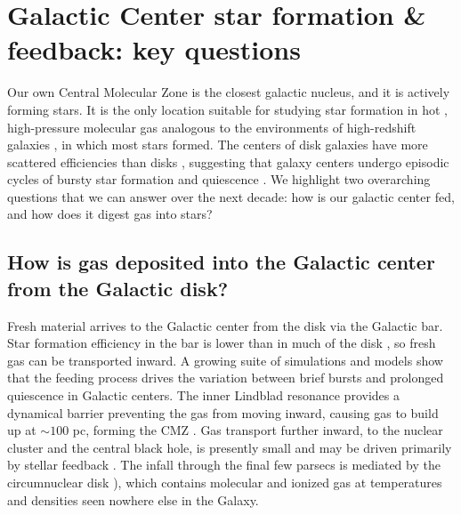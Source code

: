 \documentclass[modern]{aastex62}
\begin{document}
\clearpage

\section{Galactic Center star formation \& feedback: key questions}



Our own Central Molecular Zone is the closest galactic nucleus, and it is
actively forming stars. It is the only location suitable for studying star
formation in hot \citep{Ao2013a, Ginsburg2016a, Krieger2017a}, high-pressure
molecular gas analogous to the environments of high-redshift galaxies
\citep{Kruijssen2013a}, in which most stars formed. The centers of disk
galaxies have more scattered efficiencies than disks
\citep{Leroy2013a,Usero2015a,Bigiel2016a,Gallagher2018a}, suggesting that
galaxy centers undergo episodic cycles of bursty star formation and quiescence
\citep[e.g.][]{Kruijssen2014c,Krumholz2017a,Torrey2017c,Seo2019a}.
We highlight two overarching questions that we can answer over the next decade:
how is our galactic center fed, and how does it digest gas into stars?


\subsection{How is gas deposited into the Galactic center from the Galactic disk?}
Fresh material arrives to the Galactic center from the disk via the Galactic bar.
Star formation efficiency in the bar is lower than in much of the disk
\citep[e.g.][]{Muraoka2019a,Seo2019a}, so fresh gas can be transported inward.
A growing suite of simulations and models
\citep{Krumholz2015c,Sormani2015a,Torrey2017c,Ridley2017a,Krumholz2017a,Sormani2018a,Jeffreson2018b}
show that the feeding process drives the variation between brief bursts and
prolonged quiescence in Galactic centers.  The inner Lindblad resonance provides
a dynamical barrier preventing the gas from moving inward, causing gas to build
up at $\sim100$ pc, forming the CMZ \citep{Krumholz2015c}.  Gas transport further
inward, to the nuclear cluster and the central black hole, is presently small
and may be driven primarily by stellar feedback
\citep[e.g.,][]{Davies2007a,Kruijssen2017a,Sormani2018b}. The infall through
the final few parsecs is mediated by the circumnuclear disk \citep[CND;
e.g.,][]{Takekawa2017a,Hsieh2017a}), which contains molecular and ionized gas
at temperatures and densities seen nowhere else in the Galaxy.
\end{document}

